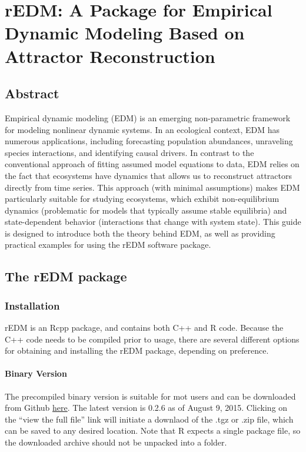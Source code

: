 \chapter{rEDM: A Package for Empirical Dynamic Modeling Based on Attractor Reconstruction}
\label{chap_redm_package}

\lstset{basicstyle = \small\ttfamily, breaklines = true, showspaces = false, showstringspaces = false}

\section{Abstract}
Empirical dynamic modeling (EDM) is an emerging non-parametric framework for modeling nonlinear dynamic systems. In an ecological context, EDM has numerous applications, including forecasting population abundances, unraveling species interactions, and identifying causal drivers. In contrast to the conventional approach of fitting assumed model equations to data, EDM relies on the fact that ecosystems have dynamics that allows us to reconstruct attractors directly from time series. This approach (with minimal assumptions) makes EDM particularly suitable for studying ecosystems, which exhibit non-equilibrium dynamics (problematic for models that typically assume stable equilibria) and state-dependent behavior (interactions that change with system state). This guide is designed to introduce both the theory behind EDM, as well as providing practical examples for using the rEDM software package.

\section{The rEDM package}

\subsection{Installation}
rEDM is an Rcpp package, and contains both C++ and R code. Because the C++ code needs to be compiled prior to usage, there are several different options for obtaining and installing the rEDM package, depending on preference.

\subsubsection{Binary Version}
The precompiled binary version is suitable for mot users and can be downloaded from Github \href{https://github.com/ha0ye/rEDM-binary}{here}. The latest version is 0.2.6 as of August 9, 2015. Clicking on the ``view the full file'' link will initiate a downlaod of the .tgz or .zip file, which can be saved to any desired location. Note that R expects a single package file, so the downloaded archive should not be unpacked into a folder.

